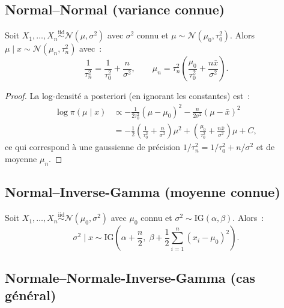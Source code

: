 \subsection{Normal--Normal (variance connue)}

\begin{theoreme}
Soit $X_1, \ldots, X_n \overset{\text{iid}}{\sim} \mathcal{N}(\mu, \sigma^2)$
avec $\sigma^2$ connu et $\mu \sim \mathcal{N}(\mu_0, \tau_0^2)$.
Alors $\mu \mid x \sim \mathcal{N}(\mu_n, \tau_n^2)$ avec~:
\[
  \frac{1}{\tau_n^2} = \frac{1}{\tau_0^2} + \frac{n}{\sigma^2},
  \qquad
  \mu_n = \tau_n^2\left(\frac{\mu_0}{\tau_0^2} + \frac{n\bar{x}}{\sigma^2}\right).
\]
\end{theoreme}

\begin{proof}
La log-densit\'e a posteriori (en ignorant les constantes) est~:
\begin{align*}
  \log \pi(\mu \mid x)
  &\propto -\frac{1}{2\tau_0^2}(\mu - \mu_0)^2
  - \frac{n}{2\sigma^2}(\mu - \bar{x})^2 \\
  &= -\frac{1}{2}\left(\frac{1}{\tau_0^2} + \frac{n}{\sigma^2}\right)
  \mu^2 + \left(\frac{\mu_0}{\tau_0^2} + \frac{n\bar{x}}{\sigma^2}\right)\mu
  + C,
\end{align*}
ce qui correspond \`a une gaussienne de pr\'ecision
$1/\tau_n^2 = 1/\tau_0^2 + n/\sigma^2$ et de moyenne $\mu_n$.
\end{proof}

\subsection{Normal--Inverse-Gamma (moyenne connue)}

\begin{theoreme}
Soit $X_1, \ldots, X_n \overset{\text{iid}}{\sim} \mathcal{N}(\mu_0, \sigma^2)$
avec $\mu_0$ connu et $\sigma^2 \sim \text{IG}(\alpha, \beta)$. Alors~:
\[
  \sigma^2 \mid x \sim \text{IG}\!\left(\alpha + \frac{n}{2},\;
  \beta + \frac{1}{2}\sum_{i=1}^n (x_i - \mu_0)^2\right).
\]
\end{theoreme}

\subsection{Normale--Normale-Inverse-Gamma (cas g\'en\'eral)}


